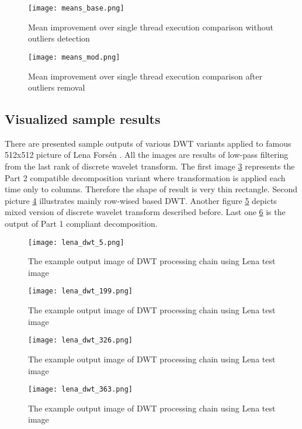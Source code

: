 \begin{figure}[!htb]
    \centering
    \texttt{[image: means\_base.png]}
    \caption{Mean improvement over single thread execution comparison without outliers detection}
    \label{fig:time_comparison_means_base}
\end{figure}

\begin{figure}[!htb]
    \centering
    \texttt{[image: means\_mod.png]}
    \caption{Mean improvement over single thread execution comparison after outliers removal}
    \label{fig:time_comparison_means_mod}
\end{figure}

\subsection{Visualized sample results}

There are presented sample outputs of various DWT variants applied to famous 512x512 picture
of Lena Forsén \cite{lena}. All the images are results of low-pass filtering from the last
rank of discrete wavelet transform. The first image \ref{fig:lena_dwt_5} represents the Part 2
compatible decomposition variant where transformation is applied each time only to columns.
Therefore the shape of result is very thin rectangle. Second picture \ref{fig:lena_dwt_199}
illustrates mainly row-wised based DWT.
Another figure \ref{fig:lena_dwt_326} depicts mixed version of discrete wavelet transform described
before. Last one \ref{fig:lena_dwt_363} is the output of Part 1 compliant decomposition.

\begin{figure}[!htb]
    \centering
    \texttt{[image: lena\_dwt\_5.png]}
    \caption{The example output image of DWT processing chain using Lena test image \cite{lena}}
    \label{fig:lena_dwt_5}
\end{figure}

\begin{figure}[!htb]
    \centering
    \texttt{[image: lena\_dwt\_199.png]}
    \caption{The example output image of DWT processing chain using Lena test image \cite{lena}}
    \label{fig:lena_dwt_199}
\end{figure}

\begin{figure}[!htb]
    \centering
    \texttt{[image: lena\_dwt\_326.png]}
    \caption{The example output image of DWT processing chain using Lena test image \cite{lena}}
    \label{fig:lena_dwt_326}
\end{figure}

\begin{figure}[!htb]
    \centering
    \texttt{[image: lena\_dwt\_363.png]}
    \caption{The example output image of DWT processing chain using Lena test image \cite{lena}}
    \label{fig:lena_dwt_363}
\end{figure}
